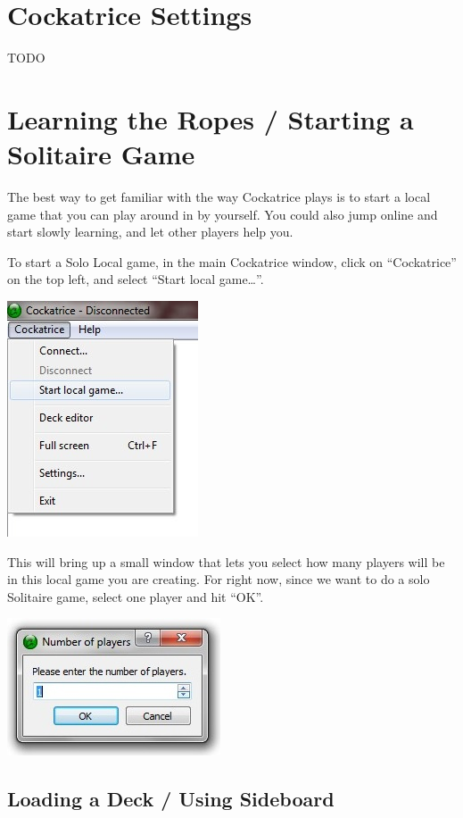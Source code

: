 \documentclass[a4paper]{scrbook}
\begin{document}
\section{Cockatrice Settings}
TODO

\section{Learning the Ropes / Starting a Solitaire Game}
The best way to get familiar with the way Cockatrice plays is to start a local game that you can play around in by yourself. You could also jump online and start slowly learning, and let other players help you.

To start a Solo Local game, in the main Cockatrice window, click on “Cockatrice” on the top left, and select “Start local game…”.

\begin{center}
\includegraphics{pics/fetch2ab8}
\end{center}

This will bring up a small window that lets you select how many players will be in this local game you are creating. For right now, since we want to do a solo Solitaire game, select one player and hit “OK”.

\begin{center}
\includegraphics{pics/fetchf010}
\end{center}

\subsection{Loading a Deck / Using Sideboard}
\end{document}

